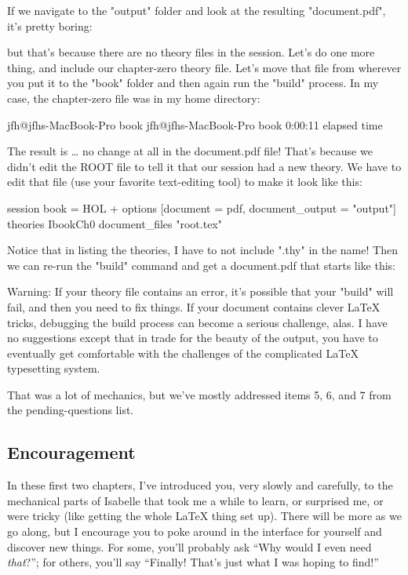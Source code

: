 If we navigate to the "output" folder and look at the resulting "document.pdf", it's pretty boring:


but that's because there are no theory files in the session. Let's do one more thing, and include our chapter-zero theory file. Let's move that file from wherever you put it to the "book" folder and then again run the "build" process. In my case, the chapter-zero file was in my home directory:

jfh@jfhs-MacBook-Pro book %
jfh@jfhs-MacBook-Pro book %
0:00:11 elapsed time

The result is … no change at all in the document.pdf file! That's because we didn't edit the ROOT file to tell it that our session had a new theory. We have to edit that file (use your favorite text-editing tool) to make it look like this:

session book = HOL +
  options [document = pdf, document_output = "output"]
  theories IbookCh0
  document_files
    "root.tex"

Notice that in listing the theories, I have to not include ".thy" in the name! 
Then we can re-run the "build" command and get a document.pdf that starts like this:




Warning: If your theory file contains an error, it's possible that your "build" will fail, and then you need to fix things. If your document contains clever LaTeX tricks, debugging the build process can become a serious challenge, alas. I have no suggestions except that in trade for the beauty of the output, you have to eventually get comfortable with the challenges of the complicated LaTeX typesetting system.

That was a lot of mechanics, but we've mostly addressed items 5, 6, and 7 from the pending-questions list. 

\subsection{Encouragement}
In these first two chapters, I've introduced you, very slowly and carefully, to the mechanical parts of Isabelle that took me a while to learn, or surprised me, or were tricky (like getting the whole LaTeX thing set up). There will be more as we go along, but I encourage you to poke around in the interface for yourself and discover new things. For some, you'll probably ask ``Why would I even need \textit{that}?''; for others, you'll say ``Finally! That's just what I was hoping to find!'' 

